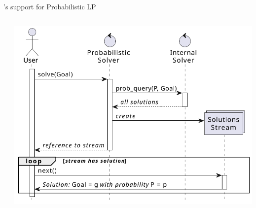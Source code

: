 \documentclass[presentation]{beamer}\mode<presentation>{\usetheme{AMSBolognaFC}}
\begin{document}
\begin{frame}{\twopkt{}'s support for Probabilistic LP}
    \begin{columns}
        \begin{column}{.49\linewidth}
        \end{column}
        \begin{column}{.49\linewidth}
            \includegraphics[width=\linewidth]{figures/general-api.pdf}
        \end{column}
    \end{columns}


\end{frame}
\end{document}

